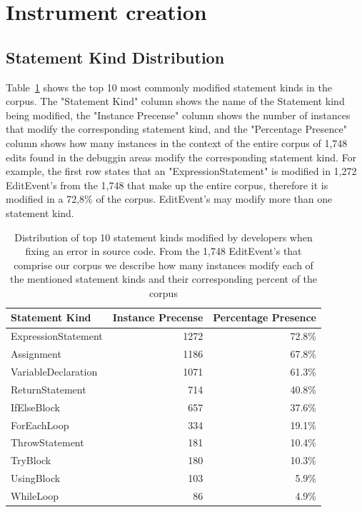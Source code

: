 \documentclass[sigconf]{acmart}
\begin{document}
\section{Instrument creation}

\subsection{Statement Kind Distribution}
\label{stmtKindDistribution}
Table~\ref{corpusDist} shows the top 10 most commonly modified 
statement kinds
in the corpus. The "Statement Kind" column shows the name of the 
Statement kind being modified, the "Instance Precense" column
shows the number of instances that modify the corresponding
statement kind, and the "Percentage Presence" column shows 
how many instances in the context of the entire corpus of 
1,748 edits found in the debuggin areas modify the corresponding
statement kind. For example, the first row states that
an "ExpressionStatement" is modified in 1,272 EditEvent's from the
1,748 that make up the entire corpus, therefore  it is modified
in a 72,8\% of the corpus. EditEvent's may modify more than one
statement kind.

\begin{table}[]
\centering
\caption{Distribution of top 10 statement kinds modified by 
developers when fixing an error in source code. From the 1,748 
EditEvent's that comprise our corpus we describe how many instances
modify each of the mentioned statement kinds and their corresponding
percent of the corpus}
\label{corpusDist}
\begin{tabular}{lrr}
\toprule
Statement Kind      & Instance Precense & Percentage Presence  \\
\midrule
ExpressionStatement & 1272 & 72.8\% \\
Assignment          & 1186 & 67.8\% \\
VariableDeclaration & 1071 & 61.3\% \\
ReturnStatement     & 714  & 40.8\% \\
IfElseBlock         & 657  & 37.6\% \\
ForEachLoop         & 334  & 19.1\% \\
ThrowStatement      & 181  & 10.4\% \\
TryBlock            & 180  & 10.3\% \\
UsingBlock          & 103  & 5.9\%  \\
WhileLoop           & 86   & 4.9\%  \\
\bottomrule
\end{tabular}
\end{table}
\end{document}
